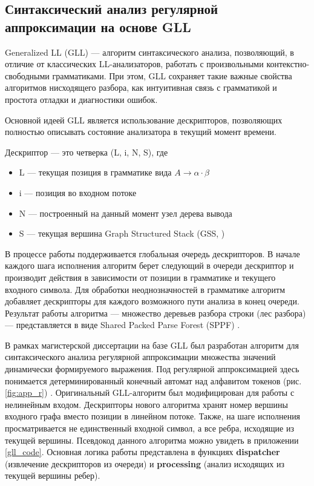 \subsection{Синтаксический анализ регулярной аппроксимации на основе GLL}

Generalized LL (GLL) \cite{gll} --- алгоритм синтаксического анализа, позволяющий, в отличие от классических LL-анализаторов, работать с произвольными контекстно-свободными грамматиками. 
При этом, GLL сохраняет такие важные свойства алгоритмов нисходящего разбора, как интуитивная связь с грамматикой и простота отладки и диагностики ошибок.

Основной идеей GLL является использование дескрипторов, позволяющих полностью описывать состояние анализатора в текущий момент времени.

\begin{definition}
	Дескриптор --- это четверка (L, i, N, S), где
	\begin{itemize}
		\setlength\itemsep{0em}
		\item L --- текущая позиция в грамматике вида $A \rightarrow \alpha \cdot \beta$
		\item i --- позиция во входном потоке
		\item N --- построенный на данный момент узел дерева вывода
		\item S --- текущая вершина Graph Structured Stack (GSS, \cite{tomita})  
	\end{itemize}
\end{definition}  

В процессе работы поддерживается глобальная очередь дескрипторов. В начале каждого шага исполнения алгоритм берет следующий в очереди дескриптор и производит действия в зависимости от позиции в грамматике и текущего входного символа. 
Для обработки неоднозначностей в грамматике алгоритм добавляет дескрипторы для каждого возможного пути анализа в конец очереди. Результат работы алгоритма ---  множество деревьев разбора строки (лес разбора) --- представляется в виде Shared Packed Parse Forest (SPPF) \cite{sppf}.

В рамках магистерской диссертации \cite{gll_reg} на базе GLL был разработан алгоритм для синтаксического анализа регулярной аппроксимации множества значений динамически формируемого выражения. 
Под регулярной аппроксимацией здесь понимается детерминированный конечный автомат над алфавитом токенов (рис. \ref{fig:app_r}) . Оригинальный GLL-алгоритм был модифицирован для работы с нелинейным входом. 
Дескрипторы нового алгоритма хранят номер вершины входного графа вместо позиции в линейном потоке. Также, на шаге исполнения просматривается не единственный входной символ, а все ребра, исходящие из текущей вершины. Псевдокод данного алгоритма можно увидеть в приложении \ref{gll_code}. Основная логика работы представлена в функциях \textbf{dispatcher} (извлечение дескрипторов из очереди) и \textbf{processing} (анализ исходящих из текущей вершины ребер).

